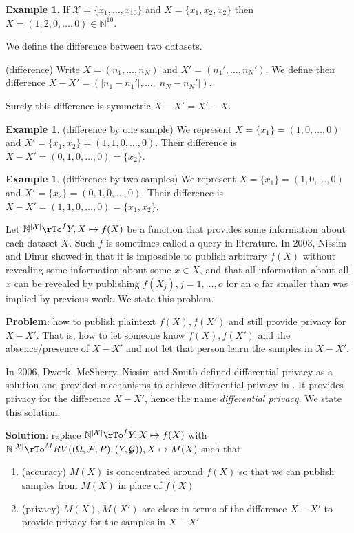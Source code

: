 \documentclass[12pt]{amsart}
\theoremstyle{definition}
\newtheorem{example}[theorem]{Example}
\begin{document}
\begin{example} If $\mathcal{X} = \{x_1, \dots , x_{10}\}$ and $X = \{x_1, x_2, x_2\}$ then $X = (1, 2, 0, \dots , 0) \in \mathbb{N}^{10}$.
\end{example}

We define the difference between two datasets.

\dfn \label{difference_datasets} (difference) Write $X = (n_1, \dots , n_N)$ and $X' = (n_1', \dots , n_N')$. We define their difference $X - X' = (|n_1 - n_1'|, \dots , |n_N - n_N'|)$.

Surely this difference is symmetric $X - X' = X' - X$.

\begin{example} \label{difference_by_1} (difference by one sample) We represent $X = \{x_1\} = (1, 0, \dots , 0)$ and $X' = \{x_1, x_2\} = (1, 1, 0, \dots , 0)$. Their difference is $X - X' = (0, 1, 0, \dots , 0) = \{x_2\}$.
\end{example}

\begin{example} \label{difference_by_2} (difference by two samples) We represent $X = \{x_1\} = (1, 0, \dots , 0)$ and $X' = \{x_2\} = (0, 1, 0, \dots , 0)$. Their difference is $X - X' = (1, 1, 0, \dots , 0) = \{x_1, x_2\}$.
\end{example}

Let $\mathbb{N}^{|\mathcal{X}|} \rTo^f Y, X \mapsto f(X)$ be a function that provides some information about each dataset $X$. Such $f$ is sometimes called a query in literature. In 2003, Nissim and Dinur showed in \cite{revealing_information} that it is impossible to publish arbitrary $f(X)$ without revealing some information about some $x \in X$, and that all information about all $x$ can be revealed by publishing $f(X_j), j = 1, \dots , o$ for an $o$ far smaller than was implied by previous work. We state this problem.

\textbf{Problem}: how to publish plaintext $f(X), f(X')$ and still provide privacy for $X - X'$. That is, how to let someone know $f(X), f(X')$ and the absence/presence of $X - X'$ and not let that person learn the samples in $X - X'$.

In 2006, Dwork, McSherry, Nissim and Smith defined differential privacy as a solution and provided mechanisms to achieve differential privacy in \cite{calibrating_noise}. It provides privacy for the difference $X - X'$, hence the name \textit{differential privacy}. We state this solution.

\textbf{Solution}: \label{solution} replace $\mathbb{N}^{|\mathcal{X}|} \rTo^f Y, X \mapsto f(X)$ with $\mathbb{N}^{|\mathcal{X}|} \rTo^M RV((\Omega, \mathcal{F}, P), (Y, \mathcal{G})), X \mapsto M(X)$ such that
\begin{enumerate}[\indent 1.]
\item \label{mechanism_accuracy} (accuracy) $M(X)$ is concentrated around $f(X)$ so that we can publish samples from $M(X)$ in place of $f(X)$
\item \label{mechanism_privacy} (privacy) $M(X), M(X')$ are close in terms of the difference $X - X'$ to provide privacy for the samples in $X - X'$
\end{enumerate}
\end{document}
